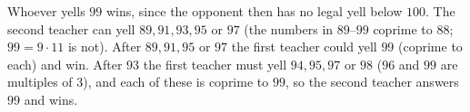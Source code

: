 Whoever yells $99$ wins, since the opponent then has no legal yell below $100$. The second teacher can yell $89,91,93,95$ or $97$ (the numbers in $89$--$99$ coprime to $88$; $99=9\cdot11$ is not). After $89,91,95$ or $97$ the first teacher could yell $99$ (coprime to each) and win. After $\boxed{93}$ the first teacher must yell $94,95,97$ or $98$ ($96$ and $99$ are multiples of $3$), and each of these is coprime to $99$, so the second teacher answers $99$ and wins.
